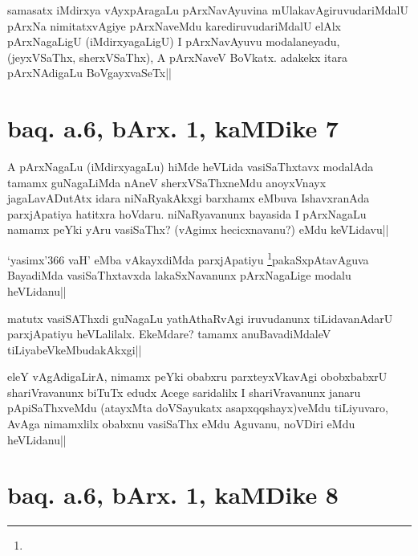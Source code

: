 

\begin{artha}
samasatx iMdirxya vAyxpAragaLu pArxNavAyuvina mUlakavAgiruvudariMdalU 
pArxNa nimitatxvAgiye pArxNaveMdu karediruvudariMdalU elAlx 
pArxNagaLigU (iMdirxyagaLigU) I pArxNavAyuvu modalaneyadu, 
(jeyxVSaThx, sherxVSaThx), A pArxNaveV BoVkatx. adakekx itara 
pArxNAdigaLu BoVgayxvaSeTx||
\end{artha}

\section*{baq. a.6, bArx. 1, kaMDike 7}

\stext


\begin{artha}
A pArxNagaLu (iMdirxyagaLu) hiMde heVLida vasiSaThxtavx modalAda 
tamamx guNagaLiMda nAneV sherxVSaThxneMdu anoyxVnayx jagaLavADutAtx 
idara niNaRyakAkxgi barxhamx eMbuva IshavxranAda parxjApatiya hatitxra 
hoVdaru. niNaRyavanunx bayasida I pArxNagaLu namamx peYki yAru 
vasiSaThx? (vAgimx hecicxnavanu?) eMdu keVLidavu||
\end{artha}


\begin{artha}
`yasimx\char'366 vaH' eMba vAkayxdiMda parxjApatiyu \footnote[1]{}pakaSxpAtavAguva 
BayadiMda vasiSaThxtavxda lakaSxNavanunx pArxNagaLige modalu 
heVLidanu||
\end{artha}

\begin{artha}
matutx vasiSAThxdi guNagaLu yathAthaRvAgi iruvudanunx tiLidavanAdarU 
parxjApatiyu heVLalilalx. EkeMdare? tamamx anuBavadiMdaleV 
tiLiyabeVkeMbudakAkxgi||
\end{artha}


\begin{artha}
eleY vAgAdigaLirA, nimamx peYki obabxru parxteyxVkavAgi obobxbabxrU 
shariVravanunx biTuTx edudx Acege saridalilx I shariVravanunx janaru 
pApiSaThxveMdu (atayxMta doVSayukatx asapxqqshayx)veMdu tiLiyuvaro, 
AvAga nimamxlilx obabxnu vasiSaThx eMdu Aguvanu, noVDiri eMdu 
heVLidanu||
\end{artha}

\section*{baq. a.6, bArx. 1, kaMDike 8}


